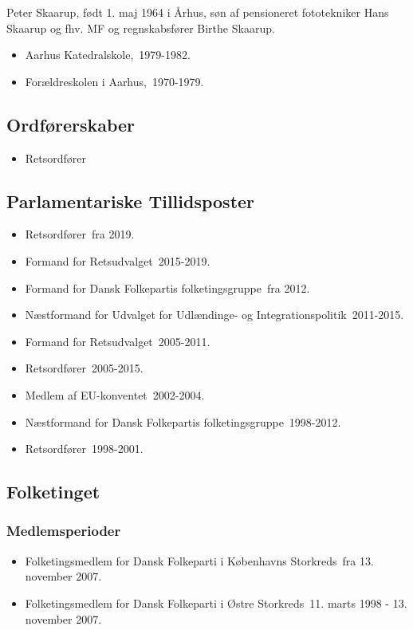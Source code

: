 \documentclass[11pt, a4paper]{awesome-cv}
\begin{document}
\makecvheader[R]
\makelettertitle
\begin{cvletter}
Peter Skaarup, født 1. maj 1964 i Århus, søn af pensioneret fototekniker Hans Skaarup og fhv. MF og regnskabsfører Birthe Skaarup.

\begin{itemize}
\item Aarhus Katedralskole, 1979-1982.
\item Forældreskolen i Aarhus, 1970-1979.
\end{itemize}
\subsection*{Ordførerskaber}
\begin{itemize}
\item Retsordfører
\end{itemize}
\subsection*{Parlamentariske Tillidsposter}
\begin{itemize}
\item Retsordfører fra 2019.
\item Formand for Retsudvalget 2015-2019.
\item Formand for Dansk Folkepartis folketingsgruppe fra 2012.
\item Næstformand for Udvalget for Udlændinge- og Integrationspolitik 2011-2015.
\item Formand for Retsudvalget 2005-2011.
\item Retsordfører 2005-2015.
\item Medlem af EU-konventet 2002-2004.
\item Næstformand for Dansk Folkepartis folketingsgruppe 1998-2012.
\item Retsordfører 1998-2001.
\end{itemize}
\subsection*{Folketinget}
\subsubsection*{Medlemsperioder}
\begin{itemize}
\item Folketingsmedlem for Dansk Folkeparti i Københavns Storkreds fra 13. november 2007.
\item Folketingsmedlem for Dansk Folkeparti i Østre Storkreds 11. marts 1998 - 13. november 2007.
\end{itemize}

\end{cvletter}
\end{document}
